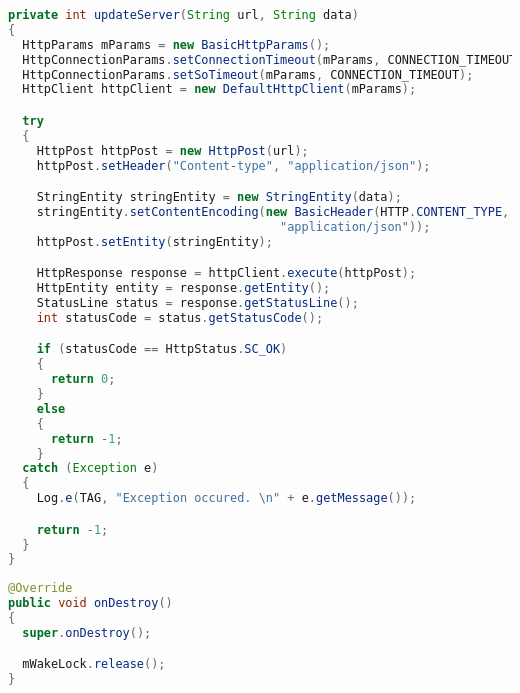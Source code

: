\documentclass[11pt, a4paper, oneside, english]{scrbook}
\begin{document}
\begin{lstlisting}[language=Java, numbers=none]
private int updateServer(String url, String data)
{    
  HttpParams mParams = new BasicHttpParams();
  HttpConnectionParams.setConnectionTimeout(mParams, CONNECTION_TIMEOUT);
  HttpConnectionParams.setSoTimeout(mParams, CONNECTION_TIMEOUT);
  HttpClient httpClient = new DefaultHttpClient(mParams);

  try
  {
    HttpPost httpPost = new HttpPost(url);
    httpPost.setHeader("Content-type", "application/json");

    StringEntity stringEntity = new StringEntity(data);
    stringEntity.setContentEncoding(new BasicHeader(HTTP.CONTENT_TYPE,
                                      "application/json"));
    httpPost.setEntity(stringEntity);

    HttpResponse response = httpClient.execute(httpPost);
    HttpEntity entity = response.getEntity();
    StatusLine status = response.getStatusLine();
    int statusCode = status.getStatusCode();

    if (statusCode == HttpStatus.SC_OK)
    {
      return 0;
    }
    else
    {
      return -1;
    }
  catch (Exception e)
  {
    Log.e(TAG, "Exception occured. \n" + e.getMessage());

    return -1;
  }
}
\end{lstlisting}
\begin{lstlisting}[language=Java, numbers=none]
@Override
public void onDestroy()
{
  super.onDestroy();

  mWakeLock.release();
}
\end{lstlisting}
\end{document}
